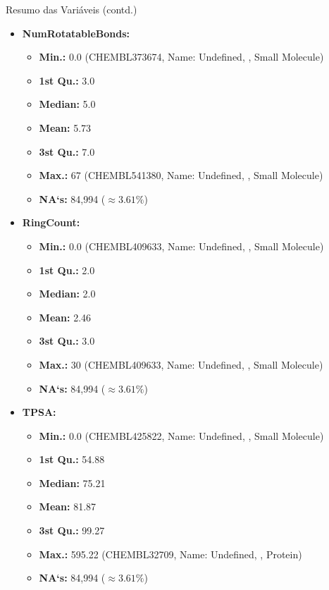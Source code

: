 \documentclass[8pt]{beamer}
\begin{document}
\begin{frame}{Resumo das Variáveis (contd.)}
\begin{multicols}{2}
  \begin{itemize}
  \item \textbf{NumRotatableBonds:}
    \begin{itemize}
        \item \textbf{Min.:} 0.0 (CHEMBL373674, Name: Undefined,  , Small Molecule)
        \item \textbf{1st Qu.:} 3.0
        \item \textbf{Median:} 5.0
        \item \textbf{Mean:} 5.73
        \item \textbf{3st Qu.:} 7.0
        \item \textbf{Max.:} 67 (CHEMBL541380, Name: Undefined, , Small Molecule)
        \item \textbf{NA`s:} 84,994 ($\approx 3.61\% $)
    \end{itemize}
    \item \textbf{RingCount:}
    \begin{itemize}
        \item \textbf{Min.:} 0.0 (CHEMBL409633, Name: Undefined,  , Small Molecule)
        \item \textbf{1st Qu.:} 2.0
        \item \textbf{Median:} 2.0
        \item \textbf{Mean:} 2.46
        \item \textbf{3st Qu.:} 3.0
        \item \textbf{Max.:} 30 (CHEMBL409633, Name: Undefined, , Small Molecule)
        \item \textbf{NA`s:} 84,994 ($\approx 3.61\% $)
    \end{itemize}
     \item \textbf{TPSA:}
    \begin{itemize}
        \item \textbf{Min.:} 0.0 (CHEMBL425822, Name: Undefined,  , Small Molecule)
        \item \textbf{1st Qu.:} 54.88
        \item \textbf{Median:} 75.21
        \item \textbf{Mean:} 81.87
        \item \textbf{3st Qu.:} 99.27
        \item \textbf{Max.:} 595.22 (CHEMBL32709, Name: Undefined, , Protein)
        \item \textbf{NA`s:} 84,994 ($\approx 3.61\% $)
    \end{itemize}
  \end{itemize}
  \end{multicols}
\end{frame}
\end{document}
